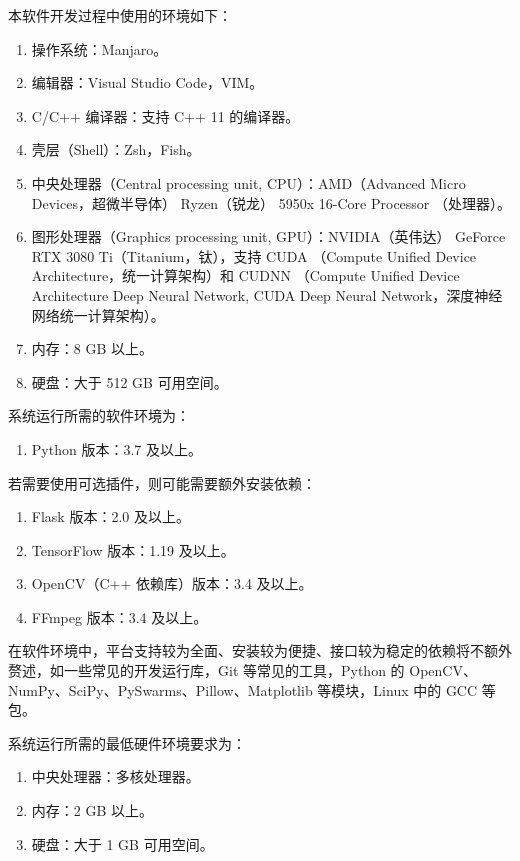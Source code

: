本软件开发过程中使用的环境如下：

\begin{enumerate}
    \item 操作系统：Manjaro。
    \item 编辑器：Visual Studio Code，VIM。
    \item C/C++ 编译器：支持 C++ 11 的编译器。
    \item 壳层（Shell）：Zsh，Fish。
    \item 中央处理器（Central processing unit, CPU）：AMD（Advanced Micro Devices，超微半导体） Ryzen（锐龙） 5950x 16-Core Processor （处理器）。
    \item 图形处理器（Graphics processing unit, GPU）：NVIDIA（英伟达） GeForce RTX 3080 Ti（Titanium，钛），支持 CUDA （Compute Unified Device Architecture，统一计算架构）和 CUDNN （Compute Unified Device Architecture Deep Neural Network, CUDA Deep Neural Network，深度神经网络统一计算架构）。
    \item 内存：8 GB 以上。
    \item 硬盘：大于 512 GB 可用空间。
\end{enumerate}

系统运行所需的软件环境为：

\begin{enumerate}
    \item Python 版本：3.7 及以上。
\end{enumerate}

若需要使用可选插件，则可能需要额外安装依赖：

\begin{enumerate}
    \item Flask 版本：2.0 及以上。
    \item TensorFlow 版本：1.19 及以上。
    \item OpenCV（C++ 依赖库）版本：3.4 及以上。
    \item FFmpeg 版本：3.4 及以上。
\end{enumerate}

在软件环境中，平台支持较为全面、安装较为便捷、接口较为稳定的依赖将不额外赘述，如一些常见的开发运行库，Git 等常见的工具，Python 的 OpenCV、NumPy、SciPy、PySwarms、Pillow、Matplotlib 等模块，Linux 中的 GCC 等包。

系统运行所需的最低硬件环境要求为：

\begin{enumerate}
    \item 中央处理器：多核处理器。
    \item 内存：2 GB 以上。
    \item 硬盘：大于 1 GB 可用空间。
\end{enumerate}

